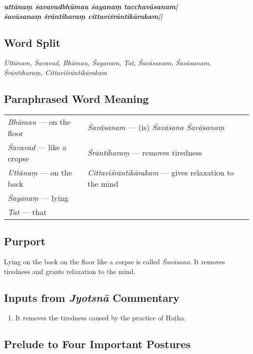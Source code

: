 \begin{shloka}
\textit{\textbf{uttānaṃ śavavadbhūmau śayanaṃ tacchavāsanam|}\\
\textbf{śavāsanaṃ śrāntiharaṃ cittaviśrāntikārakam||}}
\end{shloka}

\subsection*{Word Split}

\textit{Uttānam, Śavavad, Bhūmau, Śayanam, Tat, Śavāsanam, Śavāsanam, Śrāntiharaṃ, Cittaviśrāntikārakam}

\subsection*{Paraphrased Word Meaning}

\begin{longtable}{>{\noindent\raggedright}p{5cm}>{\noindent\raggedright}p{5cm}}
\textit{Bhūmau} --- on the floor  & \textit{Śavāsanam} --- (is) \textit{Śavāsana Śavāsanaṃ}\tabularnewline
\textit{Śavavad}  --- like a cropse  & \textit{Śrāntiharaṃ} --- removes tiredness\tabularnewline
\textit{Uttānaṃ} --- on the back  & \textit{Cittaviśrāntikārakam} --- gives relaxation to the mind\tabularnewline
\textit{Śayanaṃ} --- lying  & \tabularnewline
\textit{Tat} --- that  & 
\end{longtable}

\subsection*{Purport}

Lying on the back on the floor like a corpse is called \textit{Śavāsana}. It removes tiredness and grants relaxation to the mind. 

\subsection*{Inputs from \textit{Jyotsnā} Commentary}

\begin{enumerate}
\item It removes the tiredness caused by the practice of Haṭha. 
\end{enumerate}

\subsection*{Prelude to Four Important Postures}

